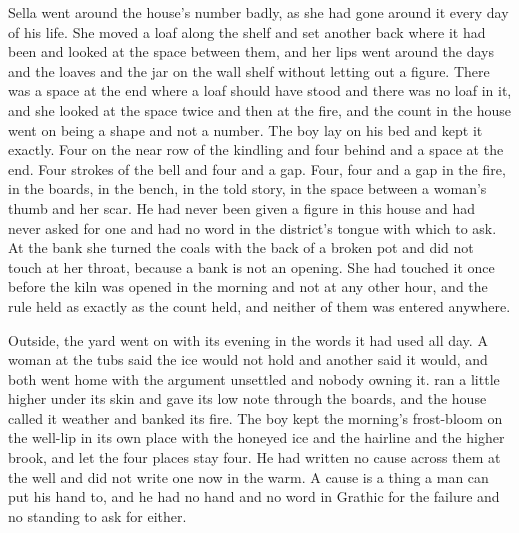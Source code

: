 Sella went around the house's number badly, as she had gone around it every day of his life. She moved a loaf along the shelf and set another back where it had been and looked at the space between them, and her lips went around the days and the loaves and the jar on the wall shelf without letting out a figure. There was a space at the end where a loaf should have stood and there was no loaf in it, and she looked at the space twice and then at the fire, and the count in the house went on being a shape and not a number. The boy lay on his bed and kept it exactly. Four on the near row of the kindling and four behind and a space at the end. Four strokes of the bell and four and a gap. Four, four and a gap in the fire, in the boards, in the bench, in the told story, in the space between a woman's thumb and her scar. He had never been given a figure in this house and had never asked for one and had no word in the district's tongue with which to ask. At the bank she turned the coals with the back of a broken pot and did not touch  at her throat, because a bank is not an opening. She had touched it once before the kiln was opened in the morning and not at any other hour, and the rule held as exactly as the count held, and neither of them was entered anywhere.

\scenebreak

Outside, the yard went on with its evening in the words it had used all day. A woman at the tubs said the ice would not hold and another said it would, and both went home with the argument unsettled and nobody owning it.  ran a little higher under its skin and gave its low note through the boards, and the house called it weather and banked its fire. The boy kept the morning's frost-bloom on the well-lip in its own place with the honeyed ice and the hairline and the higher brook, and let the four places stay four. He had written no cause across them at the well and did not write one now in the warm. A cause is a thing a man can put his hand to, and he had no hand and no word in Grathic for the failure and no standing to ask for either.

